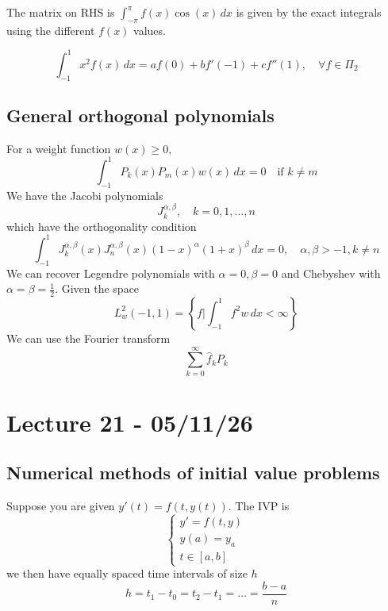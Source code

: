 \documentclass[11pt]{article}
\begin{document}
The matrix on RHS is $\int_{-\pi}^{\pi}f(x) \cos(x) \, dx$ is given by the exact integrals using the different $f(x)$ values.
\begin{example}
    \[
    \int_{-1}^{1} x^2f(x)\, dx = af(0)+bf'(-1)+cf''(1), \quad \forall f \in \Pi_2
    \]
\end{example}



\subsection{General orthogonal polynomials}
For a weight function $w(x) \ge 0$,
\[
    \int_{-1}^{1} P_k(x)P_m(x)w(x)\, dx = 0\quad \text{if } k \ne m
\]
We have the Jacobi polynomials
\[
    J_k^{\alpha, \beta}, \quad k = 0, 1, \dots, n
\]
which have the orthogonality condition
\[
    \int_{-1}^{1} J_k^{\alpha,\beta}(x)J_n^{\alpha, \beta}(x) (1-x)^\alpha (1+x)^\beta\, dx = 0, \quad \alpha, \beta > -1, k \ne n
\]
We can recover Legendre polynomials with $\alpha = 0, \beta = 0$ and Chebyshev with $\alpha = \beta = \frac{1}{2}$.
Given the space
\[
    L_w^2(-1,1) = \left\{ f | \int_{-1}^{1} f^2 w\, dx < \infty  \right\}
\]
We can use the Fourier transform
\[
    \sum_{k=0}^{\infty} \hat{f}_k P_k
\]

\section{Lecture 21 - 05/11/26}
\subsection{Numerical methods of initial value problems}
Suppose you are given $y'(t) = f(t, y(t))$. The IVP is
\[
    \begin{cases}
        y' = f(t,y) \\
        y(a) = y_a \\
        t \in [a,b]
    \end{cases}
\]
we then have equally spaced time intervals of size $h$
\[
    h = t_1-t_0 = t_2-t_1 = \dots = \frac{b-a}{n}
\]
\end{document}
